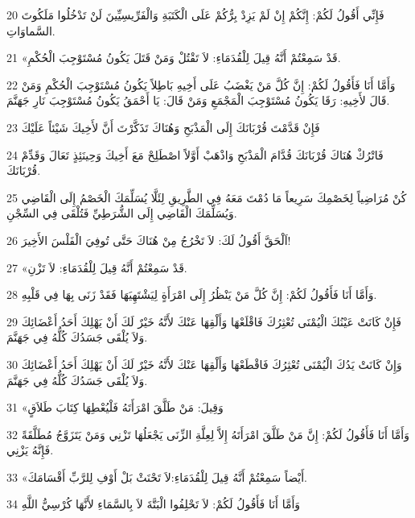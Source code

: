 \par 20 فَإِنِّي أَقُولُ لَكُمْ: إِنَّكُمْ إِنْ لَمْ يَزِدْ بِرُّكُمْ عَلَى الْكَتَبَةِ وَالْفَرِّيسِيِّينَ لَنْ تَدْخُلُوا مَلَكُوتَ السَّماوَاتِ.
\par 21 «قَدْ سَمِعْتُمْ أَنَّهُ قِيلَ لِلْقُدَمَاءِ: لاَ تَقْتُلْ وَمَنْ قَتَلَ يَكُونُ مُسْتَوْجِبَ الْحُكْمِ.
\par 22 وَأَمَّا أَنَا فَأَقُولُ لَكُمْ: إِنَّ كُلَّ مَنْ يَغْضَبُ عَلَى أَخِيهِ بَاطِلاً يَكُونُ مُسْتَوْجِبَ الْحُكْمِ وَمَنْ قَالَ لأَخِيهِ: رَقَا يَكُونُ مُسْتَوْجِبَ الْمَجْمَعِ وَمَنْ قَالَ: يَا أَحْمَقُ يَكُونُ مُسْتَوْجِبَ نَارِ جَهَنَّمَ.
\par 23 فَإِنْ قَدَّمْتَ قُرْبَانَكَ إِلَى الْمَذْبَحِ وَهُنَاكَ تَذَكَّرْتَ أَنَّ لأَخِيكَ شَيْئاً عَلَيْكَ
\par 24 فَاتْرُكْ هُنَاكَ قُرْبَانَكَ قُدَّامَ الْمَذْبَحِ وَاذْهَبْ أَوَّلاً اصْطَلِحْ مَعَ أَخِيكَ وَحِينَئِذٍ تَعَالَ وَقَدِّمْ قُرْبَانَكَ.
\par 25 كُنْ مُرَاضِياً لِخَصْمِكَ سَرِيعاً مَا دُمْتَ مَعَهُ فِي الطَّرِيقِ لِئَلَّا يُسَلِّمَكَ الْخَصْمُ إِلَى الْقَاضِي وَيُسَلِّمَكَ الْقَاضِي إِلَى الشُّرَطِيِّ فَتُلْقَى فِي السِّجْنِ.
\par 26 اَلْحَقَّ أَقُولُ لَكَ: لاَ تَخْرُجُ مِنْ هُنَاكَ حَتَّى تُوفِيَ الْفَلْسَ الأَخِيرَ!
\par 27 «قَدْ سَمِعْتُمْ أَنَّهُ قِيلَ لِلْقُدَمَاءِ: لاَ تَزْنِ.
\par 28 وَأَمَّا أَنَا فَأَقُولُ لَكُمْ: إِنَّ كُلَّ مَنْ يَنْظُرُ إِلَى امْرَأَةٍ لِيَشْتَهِيَهَا فَقَدْ زَنَى بِهَا فِي قَلْبِهِ.
\par 29 فَإِنْ كَانَتْ عَيْنُكَ الْيُمْنَى تُعْثِرُكَ فَاقْلَعْهَا وَأَلْقِهَا عَنْكَ لأَنَّهُ خَيْرٌ لَكَ أَنْ يَهْلِكَ أَحَدُ أَعْضَائِكَ وَلاَ يُلْقَى جَسَدُكَ كُلُّهُ فِي جَهَنَّمَ.
\par 30 وَإِنْ كَانَتْ يَدُكَ الْيُمْنَى تُعْثِرُكَ فَاقْطَعْهَا وَأَلْقِهَا عَنْكَ لأَنَّهُ خَيْرٌ لَكَ أَنْ يَهْلِكَ أَحَدُ أَعْضَائِكَ وَلاَ يُلْقَى جَسَدُكَ كُلُّهُ فِي جَهَنَّمَ.
\par 31 «وَقِيلَ: مَنْ طَلَّقَ امْرَأَتَهُ فَلْيُعْطِهَا كِتَابَ طَلاَقٍ
\par 32 وَأَمَّا أَنَا فَأَقُولُ لَكُمْ: إِنَّ مَنْ طَلَّقَ امْرَأَتَهُ إِلاَّ لِعِلَّةِ الزِّنَى يَجْعَلُهَا تَزْنِي وَمَنْ يَتَزَوَّجُ مُطَلَّقَةً فَإِنَّهُ يَزْنِي.
\par 33 «أَيْضاً سَمِعْتُمْ أَنَّهُ قِيلَ لِلْقُدَمَاءِ:لاَ تَحْنَثْ بَلْ أَوْفِ لِلرَّبِّ أَقْسَامَكَ.
\par 34 وَأَمَّا أَنَا فَأَقُولُ لَكُمْ: لاَ تَحْلِفُوا الْبَتَّةَ لاَ بِالسَّمَاءِ لأَنَّهَا كُرْسِيُّ اللَّهِ
